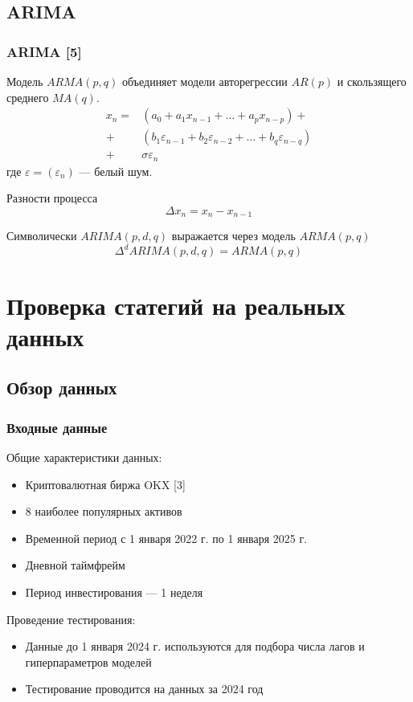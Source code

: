 \documentclass{beamer}
\renewcommand{\epsilon}{\varepsilon}
\begin{document}
\subsection{ARIMA}

\begin{frame}
    \frametitle{ARIMA [5]}
    Модель $ARMA(p, q)$ объединяет модели авторегрессии $AR(p)$ и скользящего среднего $MA(q)$.
    \begin{align*}
        x_n = & \left(a_0 + a_1 x_{n-1} + \dots + a_p x_{n-p} \right) + \\
	    + & \left(b_1 \epsilon_{n-1} + b_2 \epsilon_{n-2} + \dots + b_q \epsilon_{n - q} \right) \\
        + & \sigma \epsilon_n
    \end{align*}
    где $\epsilon = (\epsilon_n)$ --- белый шум.

    Разности процесса
    \[
        \Delta x_n = x_n - x_{n-1}
    \]

    Символически $ARIMA(p, d, q)$ выражается через модель $ARMA(p, q)$
    \[
        \Delta^d ARIMA(p, d, q) = ARMA(p, q)
    \]
\end{frame}

\section{Проверка статегий на реальных данных}

\subsection{Обзор данных}

\begin{frame}
    \frametitle{Входные данные}
    Общие характеристики данных:
    \begin{itemize}
        \item Криптовалютная биржа OKX [3]
        \item 8 наиболее популярных активов
        \item Временной период с 1 января 2022 г. по 1 января 2025 г.
        \item Дневной таймфрейм
        \item Период инвестирования --- 1 неделя
    \end{itemize}

    Проведение тестирования:
    \begin{itemize}
        \item Данные до 1 января 2024 г. используются для подбора числа лагов и 
        гиперпараметров моделей
        \item Тестирование проводится на данных за 2024 год
    \end{itemize}
\end{frame}
\end{document}
